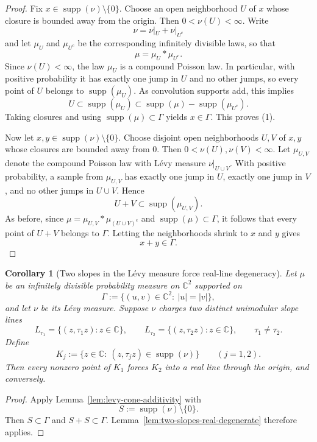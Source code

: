 \documentclass[11pt]{amsart}
\newtheorem{corollary}[theorem]{Corollary}
\newcommand{\C}{\mathbb{C}}
\newcommand{\supp}{\operatorname{supp}}
\begin{document}
\begin{proof}
Fix $x\in \supp(\nu)\setminus\{0\}$.  Choose an open neighborhood $U$ of $x$
whose closure is bounded away from the origin.  Then $0<\nu(U)<\infty$.  Write
\[
  \nu = \nu|_U + \nu|_{U^c}
\]
and let $\mu_U$ and $\mu_{U^c}$ be the corresponding infinitely divisible laws,
so that
\[
  \mu = \mu_U * \mu_{U^c}.
\]
Since $\nu(U)<\infty$, the law $\mu_U$ is a compound Poisson law.  In
particular, with positive probability it has exactly one jump in $U$ and no
other jumps, so every point of $U$ belongs to $\supp(\mu_U)$.  As convolution
supports add, this implies
\[
  U \subset \supp(\mu_U)\subset \supp(\mu)-\supp(\mu_{U^c}).
\]
Taking closures and using $\supp(\mu)\subset \Gamma$ yields $x\in \Gamma$.
This proves \textup{(1)}.

Now let $x,y\in \supp(\nu)\setminus\{0\}$.  Choose disjoint open neighborhoods
$U,V$ of $x,y$ whose closures are bounded away from $0$.  Then
$0<\nu(U),\nu(V)<\infty$.  Let $\mu_{U,V}$ denote the compound Poisson law with
L\'evy measure $\nu|_{U\cup V}$.  With positive probability, a sample from
$\mu_{U,V}$ has exactly one jump in $U$, exactly one jump in $V$, and no other
jumps in $U\cup V$.  Hence
\[
  U+V \subset \supp(\mu_{U,V}).
\]
As before, since $\mu=\mu_{U,V}*\mu_{(U\cup V)^c}$ and
$\supp(\mu)\subset \Gamma$, it follows that every point of $U+V$ belongs to
$\Gamma$.  Letting the neighborhoods shrink to $x$ and $y$ gives
\[
  x+y\in \Gamma.
\]
\end{proof}

\begin{corollary}[Two slopes in the L\'evy measure force real-line degeneracy]
\label{cor:levy-two-slopes}
Let $\mu$ be an infinitely divisible probability measure on $\C^2$ supported on
\[
  \Gamma:=\{(u,v)\in\C^2:\ |u|=|v|\},
\]
and let $\nu$ be its L\'evy measure.  Suppose $\nu$ charges two distinct
unimodular slope lines
\[
  L_{\tau_1}=\{(z,\tau_1 z): z\in\C\},
  \qquad
  L_{\tau_2}=\{(z,\tau_2 z): z\in\C\},
  \qquad
  \tau_1\ne \tau_2.
\]
Define
\[
  K_j:=\{z\in\C:\ (z,\tau_j z)\in \supp(\nu)\}
  \qquad (j=1,2).
\]
Then every nonzero point of $K_1$ forces $K_2$ into a real line through the
origin, and conversely.
\end{corollary}

\begin{proof}
Apply Lemma~\ref{lem:levy-cone-additivity} with
\[
  S:=\supp(\nu)\setminus\{0\}.
\]
Then $S\subset \Gamma$ and $S+S\subset \Gamma$.  Lemma~\ref{lem:two-slopes-real-degenerate}
therefore applies.
\end{proof}
\end{document}
